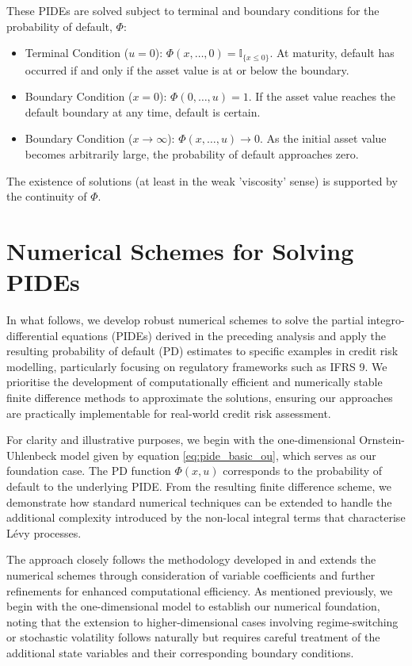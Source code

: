 \documentclass[11pt,twoside,openright]{report}
\begin{document}
These PIDEs are solved subject to terminal and boundary conditions for the probability of default, $\Phi$:
\begin{itemize}
    \item Terminal Condition ($u=0$): $\Phi(x, \dots, 0) = \mathbb{I}_{\{x \le 0\}}$. At maturity, default has occurred if and only if the asset value is at or below the boundary.
    \item Boundary Condition ($x=0$): $\Phi(0, \dots, u) = 1$. If the asset value reaches the default boundary at any time, default is certain.
    \item Boundary Condition ($x \to \infty$): $\Phi(x, \dots, u) \to 0$. As the initial asset value becomes arbitrarily large, the probability of default approaches zero.
\end{itemize}
The existence of solutions (at least in the weak 'viscosity' sense) is supported by the continuity of $\Phi$.

\section{Numerical Schemes for Solving PIDEs}

In what follows, we develop robust numerical schemes to solve the partial integro-differential equations (PIDEs) derived in the preceding analysis and apply the resulting probability of default (PD) estimates to specific examples in credit risk modelling, particularly focusing on regulatory frameworks such as IFRS 9. We prioritise the development of computationally efficient and numerically stable finite difference methods to approximate the solutions, ensuring our approaches are practically implementable for real-world credit risk assessment.

For clarity and illustrative purposes, we begin with the one-dimensional Ornstein-Uhlenbeck model given by equation \eqref{eq:pide_basic_ou}, which serves as our foundation case. The PD function $\Phi(x, u)$ corresponds to the probability of default to the underlying PIDE. From the resulting finite difference scheme, we demonstrate how standard numerical techniques can be extended to handle the additional complexity introduced by the non-local integral terms that characterise Lévy processes.

The approach closely follows the methodology developed in \cite{cont2005finite} and extends the numerical schemes through consideration of variable coefficients and further refinements for enhanced computational efficiency. As mentioned previously, we begin with the one-dimensional model to establish our numerical foundation, noting that the extension to higher-dimensional cases involving regime-switching or stochastic volatility follows naturally but requires careful treatment of the additional state variables and their corresponding boundary conditions.
\end{document}
